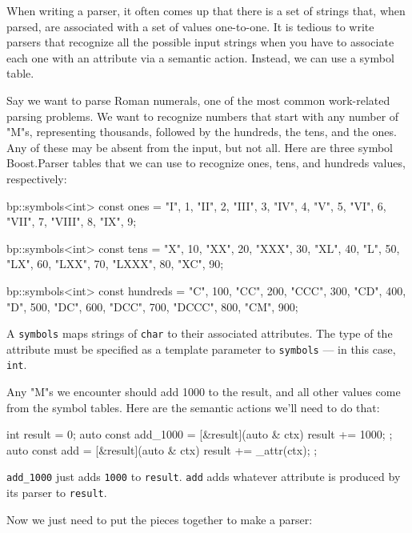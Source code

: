 When writing a parser, it often comes up that there is a set of strings that, when parsed, are associated with a set of values one-to-one. It is tedious to write parsers that recognize all the possible input strings when you have to associate each one with an attribute via a semantic action. Instead, we can use a symbol table.

Say we want to parse Roman numerals, one of the most common work-related parsing problems. We want to recognize numbers that start with any number of "M"s, representing thousands, followed by the hundreds, the tens, and the ones. Any of these may be absent from the input, but not all. Here are three symbol Boost.Parser tables that we can use to recognize ones, tens, and hundreds values, respectively:

\begin{code}
bp::symbols<int> const ones = {
    {"I", 1},
    {"II", 2},
    {"III", 3},
    {"IV", 4},
    {"V", 5},
    {"VI", 6},
    {"VII", 7},
    {"VIII", 8},
    {"IX", 9}};

bp::symbols<int> const tens = {
    {"X", 10},
    {"XX", 20},
    {"XXX", 30},
    {"XL", 40},
    {"L", 50},
    {"LX", 60},
    {"LXX", 70},
    {"LXXX", 80},
    {"XC", 90}};

bp::symbols<int> const hundreds = {
    {"C", 100},
    {"CC", 200},
    {"CCC", 300},
    {"CD", 400},
    {"D", 500},
    {"DC", 600},
    {"DCC", 700},
    {"DCCC", 800},
    {"CM", 900}};
\end{code}

A \texttt{symbols} maps strings of \texttt{char} to their associated attributes. The type of the attribute must be specified as a template parameter to \texttt{symbols} --- in this case, \texttt{int}.

Any "M"s we encounter should add 1000 to the result, and all other values come from the symbol tables. Here are the semantic actions we'll need to do that:

\begin{code}
int result = 0;
auto const add_1000 = [&result](auto & ctx) { result += 1000; };
auto const add = [&result](auto & ctx) { result += _attr(ctx); };
\end{code}

\texttt{add\_1000} just adds \texttt{1000} to \texttt{result}. \texttt{add} adds whatever attribute is produced by its parser to \texttt{result}.

Now we just need to put the pieces together to make a parser:

